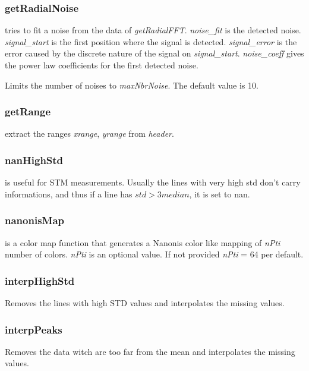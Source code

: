 \subsubsection{getRadialNoise}
\bdf
{} tries to fit a noise from the data of \emph{getRadialFFT}. \emph{noise\_fit} is the detected noise. \emph{signal\_start} is the first position where the signal is detected. \emph{signal\_error} is the error caused by the discrete nature of the signal on \emph{signal\_start}. \emph{noise\_coeff} gives the power law coefficients for the first detected noise.

 Limits the number of noises to \emph{maxNbrNoise}. The default value is 10.
\edf
\subsubsection{getRange}
\bdf
{} extract the ranges \emph{xrange}, \emph{yrange} from \emph{header}.
\edf
\subsubsection{nanHighStd}
\bdf
{} is useful for STM measurements. Usually the lines with very high std don't carry informations, and thus if a line has $std > 3 median$, it is set to nan.
\edf
\subsubsection{nanonisMap}
\bdf
{} is a color map function that generates a Nanonis color like mapping of \emph{nPti} number of colors. \emph{nPti} is an optional value. If not provided \emph{nPti} = 64 per default. 
\edf
\subsubsection{interpHighStd}
\bdf
{} Removes the lines with high STD values and interpolates the missing values.
\edf
\subsubsection{interpPeaks}
\bdf
{} Removes the data witch are too far from the mean and interpolates the missing values.
\edf

